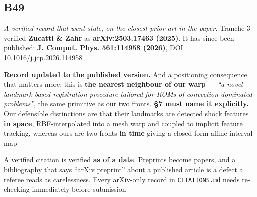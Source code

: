 \documentclass[10pt]{article}
\begin{document}
\subsection*{B49}\label{led:B49}
\begin{description}[leftmargin=0pt,itemsep=1pt]
\item[Defect.] \emph{A verified record that went stale, on the closest prior art in the paper.} Tranche 3 verified \textbf{Zucatti \& Zahr} as \textbf{arXiv:2503.17463 (2025)}. It has since been published: \textbf{J. Comput. Phys. 561:114958 (2026)}, DOI 10.1016/j.jcp.2026.114958
\item[Resolution.] \textbf{Record updated to the published version.} And a positioning consequence that matters more: this is \textbf{the nearest neighbour of our warp} --- \emph{``a novel landmark-based registration procedure tailored for ROMs of convection-dominated problems''}, the same primitive as our two fronts. \textbf{§7 must name it explicitly.} Our defensible distinctions are that their landmarks are detected shock features \textbf{in space}, RBF-interpolated into a mesh warp and coupled to implicit feature tracking, whereas ours are two fronts \textbf{in time} giving a closed-form affine interval map
\item[Note.] A verified citation is verified \textbf{as of a date}. Preprints become papers, and a bibliography that says ``arXiv preprint'' about a published article is a defect a referee reads as carelessness. Every arXiv-only record in \texttt{CITATIONS.md} needs re-checking immediately before submission
\end{description}
\end{document}
